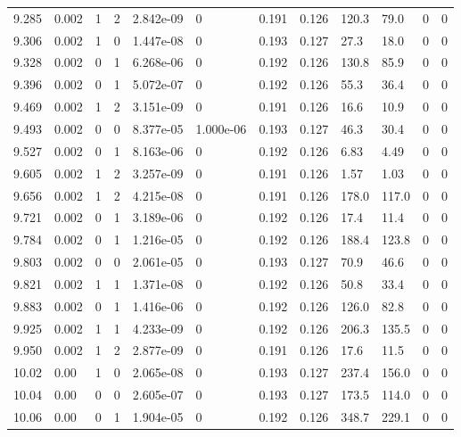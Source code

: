 \documentclass[preview]{standalone}
\begin{document}
{{{{{{{\begin{tabular}{L{1.2cm}C{1.2cm} C{0.3cm}C{0.5cm} C{1.4cm}C{1.4cm} C{1.4cm}C{1.4cm} C{1.6cm}C{1.6cm} C{1.6cm}C{1.6cm}}
  9.285  &  0.002  & 1     &  2 &  2.842e-09  & 0  &  0.191&   0.126& 120.3 & 79.0   &  0 & 0  \\ 
  9.306  &  0.002  & 1     &  0 &  1.447e-08  & 0  &  0.193&   0.127& 27.3 & 18.0   &  0 & 0  \\ 
  9.328  &  0.002  & 0     &  1 &  6.268e-06  & 0  &  0.192&   0.126& 130.8 & 85.9   &  0 & 0  \\ 
  9.396  &  0.002  & 0     &  1 &  5.072e-07  & 0  &  0.192&   0.126& 55.3 & 36.4   &  0 & 0  \\ 
  9.469  &  0.002  & 1     &  2 &  3.151e-09  & 0  &  0.191&   0.126& 16.6 & 10.9   &  0 & 0  \\ 
  9.493  &  0.002  & 0     &  0 &  8.377e-05  & 1.000e-06  &  0.193&   0.127& 46.3 & 30.4   &  0 & 0  \\ 
  9.527  &  0.002  & 0     &  1 &  8.163e-06  & 0  &  0.192&   0.126& 6.83 & 4.49   &  0 & 0  \\ 
  9.605  &  0.002  & 1     &  2 &  3.257e-09  & 0  &  0.191&   0.126& 1.57 & 1.03   &  0 & 0  \\ 
  9.656  &  0.002  & 1     &  2 &  4.215e-08  & 0  &  0.191&   0.126& 178.0 & 117.0   &  0 & 0  \\ 
  9.721  &  0.002  & 0     &  1 &  3.189e-06  & 0  &  0.192&   0.126& 17.4 & 11.4   &  0 & 0  \\ 
  9.784  &  0.002  & 0     &  1 &  1.216e-05  & 0  &  0.192&   0.126& 188.4 & 123.8   &  0 & 0  \\ 
  9.803  &  0.002  & 0     &  0 &  2.061e-05  & 0  &  0.193&   0.127& 70.9 & 46.6   &  0 & 0  \\ 
  9.821  &  0.002  & 1     &  1 &  1.371e-08  & 0  &  0.192&   0.126& 50.8 & 33.4   &  0 & 0  \\ 
  9.883  &  0.002  & 0     &  1 &  1.416e-06  & 0  &  0.192&   0.126& 126.0 & 82.8   &  0 & 0  \\ 
  9.925  &  0.002  & 1     &  1 &  4.233e-09  & 0  &  0.192&   0.126& 206.3 & 135.5   &  0 & 0  \\ 
  9.950  &  0.002  & 1     &  2 &  2.877e-09  & 0  &  0.191&   0.126& 17.6 & 11.5   &  0 & 0  \\ 
  10.02  &  0.00  & 1     &  0 &  2.065e-08  & 0  &  0.193&   0.127& 237.4 & 156.0   &  0 & 0  \\ 
  10.04  &  0.00  & 0     &  0 &  2.605e-07  & 0  &  0.193&   0.127& 173.5 & 114.0   &  0 & 0  \\ 
  10.06  &  0.00  & 0     &  1 &  1.904e-05  & 0  &  0.192&   0.126& 348.7 & 229.1   &  0 & 0  \\ 

\end{tabular}}}}}}}}
\end{document}
